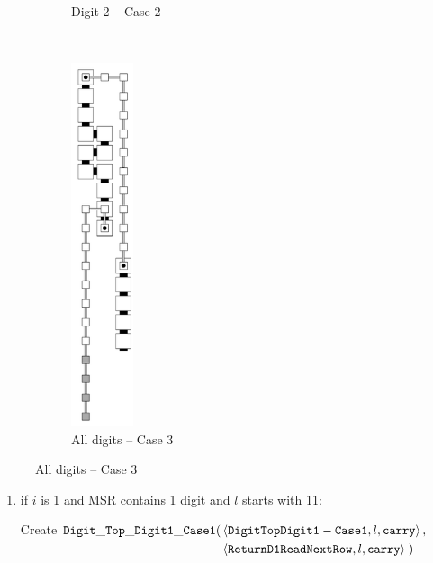 \begin{itemize}
\begin{figure}[H]
\begin{subfigure}[t]{0.2\textwidth}
                    \caption{\label{fig:digit_tops/digit_top_case2_digit2_msr} Digit 2 -- Case 2}
                \end{subfigure}%
                ~
                \begin{subfigure}[t]{0.2\textwidth}
                    \centering
                    \includegraphics[width=0.2\textwidth]{digit_tops/digit_top_case3_msr}
                    \caption{\label{fig:digit_tops/digit_top_case3_msr} All digits -- Case 3}
                \end{subfigure}%
            \end{figure}


            \begin{enumerate}[label=\alph*)]
                \item if $i$ is 1 and MSR contains 1 digit and $l$ starts with 11:

                Create
                $\begin{aligned}[t]
                    {\tt Digit\_Top\_Digit1\_Case1}(& \left \langle {\tt DigitTopDigit1-Case1}, l, {\tt carry} \right\rangle, & \\
                                     & \left \langle {\tt ReturnD1ReadNextRow},  l, {\tt carry} \right\rangle \;)
                \end{aligned}$
                \vspace{.5cm}



\end{enumerate}
\end{itemize}
